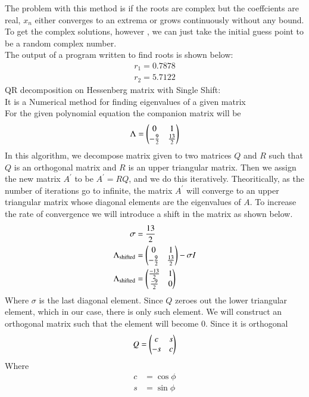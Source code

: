 \documentclass[journal]{IEEEtran}
\begin{document}
The problem with this method is if the roots are complex but the coeffcients are real, $x_n$ either converges to an extrema or grows continuously without any bound.
To get the complex solutions, however , we can just take the initial guess point to be a 
random complex number.\\
The output of a program written to find roots is shown below:
\begin{align}
	r_1 = 0.7878\\
	r_2 = 5.7122
\end{align}
QR decomposition on Hessenberg matrix with Single Shift:\\
It is a Numerical method for finding eigenvalues of a given matrix\\
For the given polynomial equation the companion matrix will be
\begin{align}
	\Lambda = \begin{pmatrix}0 & 1\\-\frac{9}{2} & \frac{13}{2}\end{pmatrix}
\end{align}
In this algorithm, we decompose matrix given to two matrices $Q$ and $R$ such that $Q$ is an orthogonal matrix and $R$ is an upper triangular matrix. Then we assign the new matrix $A^\prime$ to be $A^\prime = RQ$, and we do this iteratively. Theoritically, as the number of iterations go to infinite, the matrix $A^\prime$ will converge to an upper triangular matrix whose diagonal elements are the eigenvalues of $A$.
To increase the rate of convergence we will introduce a shift in the matrix as shown below.
\begin{align}
\sigma &= \frac{13}{2}\\
\Lambda_{\text{shifted}} &= \begin{pmatrix}0 & 1\\-\frac{9}{2} & \frac{13}{2}\end{pmatrix} - \sigma I\\
\Lambda_{\text{shifted}} &= \begin{pmatrix}\frac{-13}{2} & 1\\ \frac{-9}{2} & 0\end{pmatrix}
\end{align}
Where $\sigma$ is the last diagonal element. Since $Q$ zeroes out the lower triangular element, which in our case, there is only such element. We will construct an orthogonal matrix such that the element will become 0. Since it is orthogonal
\begin{align}
Q &= \begin{pmatrix}c & s\\-s & c\end{pmatrix}\\
\end{align}
Where
\begin{align}
c &= \cos{\phi}\\
s &= \sin{\phi}
\end{align}
\end{document}
